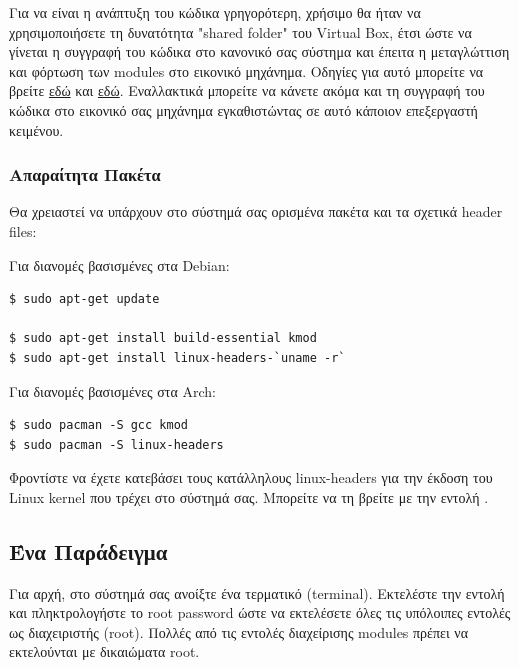 \documentclass[18pt]{extarticle}
\begin{document}
Για να είναι η ανάπτυξη του κώδικα γρηγορότερη, χρήσιμο θα ήταν να χρησιμοποιήσετε τη δυνατότητα "shared folder" του Virtual Box,
έτσι ώστε να γίνεται η συγγραφή του κώδικα στο κανονικό σας σύστημα και έπειτα η μεταγλώττιση και φόρτωση των modules στο εικονικό μηχάνημα.
Οδηγίες για αυτό μπορείτε να βρείτε \href{https://www.virtualbox.org/manual/ch04.html#sharedfolders}{εδώ} και \href{https://carleton.ca/scs/tech-support/troubleshooting-guides/creating-a-shared-folder-in-virtualbox/}{εδώ}.
Εναλλακτικά μπορείτε να κάνετε ακόμα και τη συγγραφή του κώδικα στο εικονικό σας μηχάνημα εγκαθιστώντας σε αυτό κάποιον επεξεργαστή κειμένου.

\subsubsection{Απαραίτητα Πακέτα}

Θα χρειαστεί να υπάρχουν στο σύστημά σας ορισμένα πακέτα και τα σχετικά header files:

Για διανομές βασισμένες στα Debian:

\begin{commandline}
	\begin{verbatim}
$ sudo apt-get update

$ sudo apt-get install build-essential kmod
$ sudo apt-get install linux-headers-`uname -r`
	\end{verbatim}
\end{commandline}


Για διανομές βασισμένες στα Arch:

\begin{commandline}
	\begin{verbatim}
$ sudo pacman -S gcc kmod
$ sudo pacman -S linux-headers
	\end{verbatim}
\end{commandline}


\begin{warn}[Προσοχή]
Φροντίστε να έχετε κατεβάσει τους κατάλληλους linux-headers για την έκδοση του Linux kernel που τρέχει στο σύστημά σας.
Μπορείτε να τη βρείτε με την εντολή .
\end{warn}

\subsection{Ένα Παράδειγμα}

Για αρχή, στο σύστημά σας ανοίξτε ένα τερματικό (terminal).
Εκτελέστε την εντολή  και πληκτρολογήστε το root password ώστε να εκτελέσετε όλες τις υπόλοιπες εντολές ως διαχειριστής (root). 
Πολλές από τις εντολές διαχείρισης modules πρέπει να εκτελούνται με δικαιώματα root.
\end{document}
